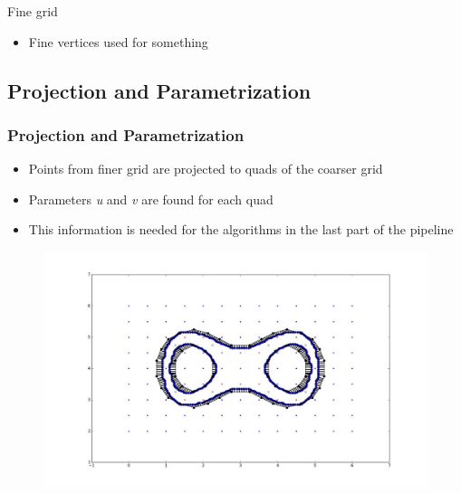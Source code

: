 \begin{frame}
\begin{overlayarea}{\textwidth}{0.9 \textheight}
\begin{minipage}{0.45\textwidth}
\begin{block}{\centering Fine grid}
\begin{figure}
	\end{figure}
	\begin{itemize}
	\item Fine vertices used for something
	\end{itemize}
	\end{block}
	\end{minipage}
	\end{overlayarea}
\end{frame}



\subsection{Projection and Parametrization}

\begin{frame}

	\frametitle{Projection and Parametrization}
	
	\begin{itemize}
	\item Points from finer grid are projected to quads of the coarser grid 
	\item Parameters \textit{u} and \textit{v} are found for each quad
	\item This information is needed for the algorithms in the last part of the pipeline
	\end{itemize}
	\begin{figure}
	\includegraphics[scale=0.35]{Pictures/DC/DC_2.pdf}
	\end{figure}
	
\end{frame}





